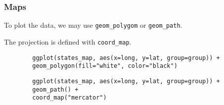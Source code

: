 \documentclass{beamer}
\begin{document}
	\begin{frame}[fragile]
		\frametitle{Maps}

		To plot the data, we may use \verb|geom_polygom| or \verb|geom_path|.

		\vspace{2em}

		The projection is defined with \verb|coord_map|.

		\vspace{2em}
	
		\begin{exampleblock}{}
		\begin{BVerbatim}
		ggplot(states_map, aes(x=long, y=lat, group=group)) +
		geom_polygon(fill="white", color="black")
		\end{BVerbatim}
		\end{exampleblock}{}

		\vspace{2em}

		\begin{exampleblock}{}
		\begin{BVerbatim}
		ggplot(states_map, aes(x=long, y=lat, group=group)) +
		geom_path() +
		coord_map("mercator")
		\end{BVerbatim}
		\end{exampleblock}{}

	\end{frame}
\end{document}
